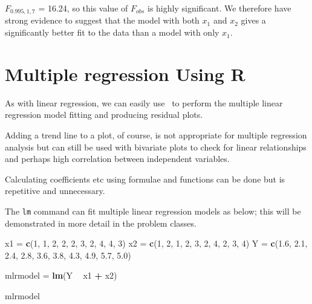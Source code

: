 \documentclass[12pt,a4paper,openany,twoside]{report}
\newenvironment{Shaded}{\begin{snugshade}}{\end{snugshade}}
\newcommand{\DecValTok}[1]{\textcolor[rgb]{0.00,0.00,0.81}{#1}}
\newcommand{\FloatTok}[1]{\textcolor[rgb]{0.00,0.00,0.81}{#1}}
\newcommand{\KeywordTok}[1]{\textcolor[rgb]{0.13,0.29,0.53}{\textbf{#1}}}
\newcommand{\NormalTok}[1]{#1}
\newcommand{\OperatorTok}[1]{\textcolor[rgb]{0.81,0.36,0.00}{\textbf{#1}}}
\newcommand{\StringTok}[1]{\textcolor[rgb]{0.31,0.60,0.02}{#1}}
\theoremstyle{definition}
\theoremstyle{remark}
\theoremstyle{plain}
\newcommand{\sR}[1]{\textbf{R}\,}
\theoremstyle{definition}
\theoremstyle{definition}
\theoremstyle{definition}
\theoremstyle{remark}
\begin{document}
\(F_{0.995,1,7}\) = 16.24, so this value of \(F_{obs}\) is highly significant. We
therefore have strong evidence to suggest that the model with both \(x_{1}\) and \(x_{2}\)
gives a significantly better fit to the data than a model with only \(x_{1}\).

\hypertarget{mlrusingr}{%
\section{Multiple regression Using R}\label{mlrusingr}}

As with linear regression, we can easily use \sR~to perform the multiple linear regression model fitting and producing residual plots.

Adding a trend line to a plot, of course, is not appropriate for multiple
regression analysis but can still be used with bivariate plots to check
for linear relationships and perhaps high correlation between
independent variables.

Calculating coefficients etc using formulae and functions can be done
but is repetitive and unnecessary.

The \texttt{lm} command can fit multiple linear regression models as below; this will be demonstrated in more detail in the problem classes.\newline

\begin{Shaded}
\begin{Highlighting}[]
\NormalTok{x1 =}\StringTok{ }\KeywordTok{c}\NormalTok{(}\DecValTok{1}\NormalTok{, }\DecValTok{1}\NormalTok{, }\DecValTok{2}\NormalTok{, }\DecValTok{2}\NormalTok{, }\DecValTok{2}\NormalTok{, }\DecValTok{3}\NormalTok{, }\DecValTok{2}\NormalTok{, }\DecValTok{4}\NormalTok{, }\DecValTok{4}\NormalTok{, }\DecValTok{3}\NormalTok{)}
\NormalTok{x2 =}\StringTok{ }\KeywordTok{c}\NormalTok{(}\DecValTok{1}\NormalTok{, }\DecValTok{2}\NormalTok{, }\DecValTok{1}\NormalTok{, }\DecValTok{2}\NormalTok{, }\DecValTok{3}\NormalTok{, }\DecValTok{2}\NormalTok{, }\DecValTok{4}\NormalTok{, }\DecValTok{2}\NormalTok{, }\DecValTok{3}\NormalTok{, }\DecValTok{4}\NormalTok{)}
\NormalTok{Y =}\StringTok{ }\KeywordTok{c}\NormalTok{(}\FloatTok{1.6}\NormalTok{, }\FloatTok{2.1}\NormalTok{, }\FloatTok{2.4}\NormalTok{, }\FloatTok{2.8}\NormalTok{, }\FloatTok{3.6}\NormalTok{, }\FloatTok{3.8}\NormalTok{, }\FloatTok{4.3}\NormalTok{, }\FloatTok{4.9}\NormalTok{, }\FloatTok{5.7}\NormalTok{, }\FloatTok{5.0}\NormalTok{)}

\NormalTok{mlrmodel =}\StringTok{ }\KeywordTok{lm}\NormalTok{(Y }\OperatorTok{~}\StringTok{ }\NormalTok{x1 }\OperatorTok{+}\StringTok{ }\NormalTok{x2)}

\NormalTok{mlrmodel}
\end{Highlighting}
\end{Shaded}
\end{document}

